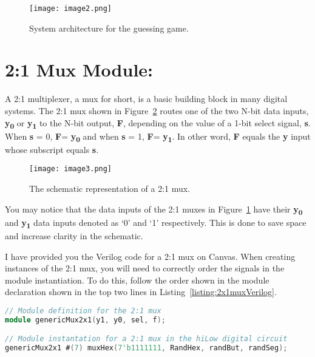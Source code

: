 \begin{figure}[ht]
\texttt{[image: image2.png]}
\caption{System architecture for the guessing game.}
\label{fig:guessGameSysArch}
\end{figure}

\hypertarget{mux-module}{%
\section{2:1 Mux Module:}\label{mux-module}}

A 2:1 multiplexer, a mux for short, is a basic building block in many
digital systems. The 2:1 mux shown in Figure~\ref{fig:2x1MuxSymbol} routes one of the two
N-bit data inputs, \textbf{y\textsubscript{0}} or
\textbf{y\textsubscript{1}} to the N-bit output, \textbf{F}, depending
on the value of a 1-bit select signal, \textbf{s}. When \textbf{s} = 0,
\textbf{F}= \textbf{y\textsubscript{0}} and when \textbf{s} = 1,
\textbf{F}= \textbf{y\textsubscript{1}}. In other word, \textbf{F}
equals the \textbf{y} input whose subscript equals \textbf{s}.

\begin{figure}[ht]
\texttt{[image: image3.png]}
\caption{The schematic representation of a 2:1 mux.}
\label{fig:2x1MuxSymbol}
\end{figure}

You may notice that the data inputs of the 2:1 muxes in Figure~\ref{fig:guessGameSysArch}
 have
their \textbf{y\textsubscript{0}} and \textbf{y\textsubscript{1}} data
inputs denoted as `0' and `1' respectively. This is done to save space
and increase clarity in the schematic.

I have provided you the Verilog code for a 2:1 mux on Canvas. When
creating instances of the 2:1 mux, you will need to correctly order the
signals in the module instantiation. To do this, follow the
order shown in the module declaration shown in the top two lines in
Listing~\ref{listing:2x1muxVerilog}.

\begin{lstlisting}[language=Verilog,
 caption={Top, module definition for a 2:1 mux.  Bottom, module instantation 
 of a 2:1 mux in Figure~\ref{fig:guessGameSysArch}.},
 label={listing:2x1muxVerilog},
 frame=single]
// Module definition for the 2:1 mux
module genericMux2x1(y1, y0, sel, f);

// Module instantation for a 2:1 mux in the hiLow digital circuit
genericMux2x1 #(7) muxHex(7'b1111111, RandHex, randBut, randSeg);
\end{lstlisting}


